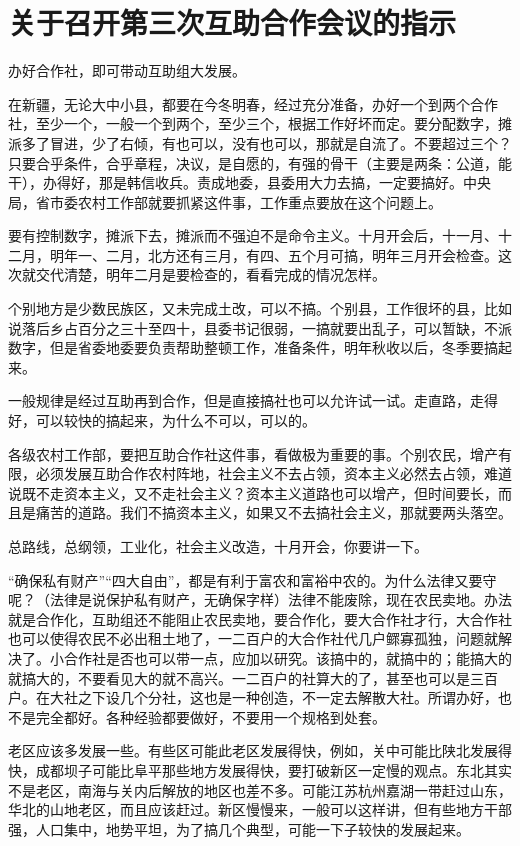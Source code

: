 \section[关于召开第三次互助合作会议的指示（一九五三年十月十五日）]{关于召开第三次互助合作会议的指示}


办好合作社，即可带动互助组大发展。

在新疆，无论大中小县，都要在今冬明春，经过充分准备，办好一个到两个合作社，至少一个，一般一个到两个，至少三个，根据工作好坏而定。要分配数字，摊派多了冒进，少了右倾，有也可以，没有也可以，那就是自流了。不要超过三个？只要合乎条件，合乎章程，决议，是自愿的，有强的骨干（主要是两条：公道，能干），办得好，那是韩信收兵。责成地委，县委用大力去搞，一定要搞好。中央局，省市委农村工作部就要抓紧这件事，工作重点要放在这个问题上。

要有控制数字，摊派下去，摊派而不强迫不是命令主义。十月开会后，十一月、十二月，明年一、二月，北方还有三月，有四、五个月可搞，明年三月开会检查。这次就交代清楚，明年二月是要检查的，看看完成的情况怎样。

个别地方是少数民族区，又未完成土改，可以不搞。个别县，工作很坏的县，比如说落后乡占百分之三十至四十，县委书记很弱，一搞就要出乱子，可以暂缺，不派数字，但是省委地委要负责帮助整顿工作，准备条件，明年秋收以后，冬季要搞起来。

一般规律是经过互助再到合作，但是直接搞社也可以允许试一试。走直路，走得好，可以较快的搞起来，为什么不可以，可以的。

各级农村工作部，要把互助合作社这件事，看做极为重要的事。个别农民，增产有限，必须发展互助合作农村阵地，社会主义不去占领，资本主义必然去占领，难道说既不走资本主义，又不走社会主义？资本主义道路也可以增产，但时间要长，而且是痛苦的道路。我们不搞资本主义，如果又不去搞社会主义，那就要两头落空。

总路线，总纲领，工业化，社会主义改造，十月开会，你要讲一下。

“确保私有财产”“四大自由”，都是有利于富农和富裕中农的。为什么法律又要守呢？（法律是说保护私有财产，无确保字样）法律不能废除，现在农民卖地。办法就是合作化，互助组还不能阻止农民卖地，要合作化，要大合作社才行，大合作社也可以使得农民不必出租土地了，一二百户的大合作社代几户鳏寡孤独，问题就解决了。小合作社是否也可以带一点，应加以研究。该搞中的，就搞中的；能搞大的就搞大的，不要看见大的就不高兴。一二百户的社算大的了，甚至也可以是三百户。在大社之下设几个分社，这也是一种创造，不一定去解散大社。所谓办好，也不是完全都好。各种经验都要做好，不要用一个规格到处套。

老区应该多发展一些。有些区可能此老区发展得快，例如，关中可能比陕北发展得快，成都坝子可能比阜平那些地方发展得快，要打破新区一定慢的观点。东北其实不是老区，南海与关内后解放的地区也差不多。可能江苏杭州嘉湖一带赶过山东，华北的山地老区，而且应该赶过。新区慢慢来，一般可以这样讲，但有些地方干部强，人口集中，地势平坦，为了搞几个典型，可能一下子较快的发展起来。

